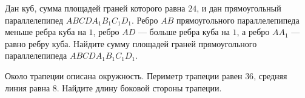 \begin{class}[number=3]
\begin{listofex}
		\item Дан куб, сумма площадей граней которого равна \( 24 \), и дан прямоугольный
		параллелепипед \( ABCDA_1B_1C_1D_1 \). Ребро \( AB \) прямоугольного
		параллелепипеда меньше ребра куба на \( 1 \), ребро \( AD \) --- больше ребра куба
		на \( 1 \), а ребро \( AA_1 \) --- равно ребру куба. Найдите сумму площадей граней
		прямоугольного параллелепипеда \( ABCDA_1B_1C_1D_1 \).
		\item Около трапеции описана окружность. Периметр трапеции равен \( 36 \),
		средняя линия равна \( 8 \). Найдите длину боковой стороны трапеции.
	\end{listofex}
\end{class}
\newpage
%
%
%
